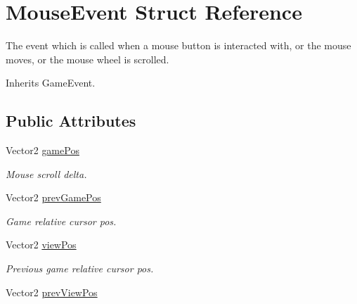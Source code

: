 \hypertarget{struct_mouse_event}{\section{Mouse\-Event Struct Reference}
\label{struct_mouse_event}
}


The event which is called when a mouse button is interacted with, or the mouse moves, or the mouse wheel is scrolled.  




Inherits Game\-Event.

\subsection*{Public Attributes}
\begin{DoxyCompactItemize}
\item 
\hypertarget{struct_mouse_event_a8a200fbcfb8923b50b7406a38f5e3db7}{Vector2 \hyperlink{struct_mouse_event_a8a200fbcfb8923b50b7406a38f5e3db7}{game\-Pos}}\label{struct_mouse_event_a8a200fbcfb8923b50b7406a38f5e3db7}

\begin{DoxyCompactList}\small\item\em Mouse scroll delta. \end{DoxyCompactList}\item 
\hypertarget{struct_mouse_event_a324a4f0131dd4262623a4b70da35679e}{Vector2 \hyperlink{struct_mouse_event_a324a4f0131dd4262623a4b70da35679e}{prev\-Game\-Pos}}\label{struct_mouse_event_a324a4f0131dd4262623a4b70da35679e}

\begin{DoxyCompactList}\small\item\em Game relative cursor pos. \end{DoxyCompactList}\item 
\hypertarget{struct_mouse_event_af64f61b3516f89361508a881878110a5}{Vector2 \hyperlink{struct_mouse_event_af64f61b3516f89361508a881878110a5}{view\-Pos}}\label{struct_mouse_event_af64f61b3516f89361508a881878110a5}

\begin{DoxyCompactList}\small\item\em Previous game relative cursor pos. \end{DoxyCompactList}\item 
\hypertarget{struct_mouse_event_ab26d958dac86d861854b7ed577bdc0b1}{Vector2 \hyperlink{struct_mouse_event_ab26d958dac86d861854b7ed577bdc0b1}{prev\-View\-Pos}}\label{struct_mouse_event_ab26d958dac86d861854b7ed577bdc0b1}


\end{DoxyCompactItemize}
